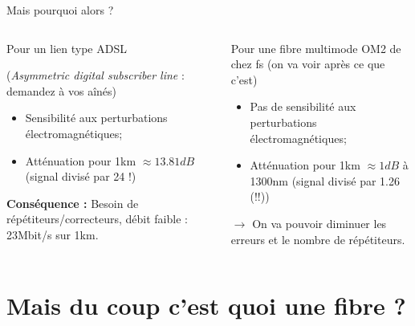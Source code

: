\documentclass[aspectratio=149, 10pt, t]{beamer}
\begin{document}
\begin{frame}{Mais pourquoi alors ?}
    \begin{columns}
    \begin{column}{0.5\linewidth}
        \medskip
        \alert{Pour un lien type ADSL}
        
        {\footnotesize(\textit{Asymmetric digital subscriber line} : demandez à vos aînés)}
        \medskip
        \begin{itemize}
            \item Sensibilité aux perturbations électromagnétiques;
            \item Atténuation pour 1km $\approx 13.81dB$ (signal divisé par 24 !)
        \end{itemize}
        \medskip
        \textbf{Conséquence :} Besoin de répétiteurs/correcteurs, débit faible : 23Mbit/s sur 1km.
    \end{column}
    \begin{column}{0.5\linewidth}
        \medskip
        \alert{Pour une fibre multimode OM2 de chez fs}
        {\footnotesize (on va voir après ce que c'est)}
        \medskip
        \begin{itemize}
            \item Pas de sensibilité aux perturbations électromagnétiques;
            \item Atténuation pour 1km $\approx 1dB$ à 1300nm (signal divisé par 1.26 (!!))
        \end{itemize}
        $\longrightarrow$ On va pouvoir diminuer les erreurs et le nombre de répétiteurs.
    \end{column}
    \end{columns}
\end{frame}

\section{Mais du coup c'est quoi une fibre ?}
\end{document}
